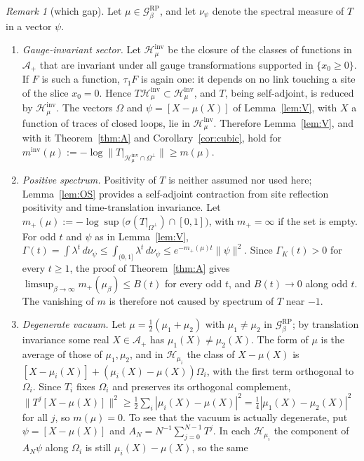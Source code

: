 \documentclass[11pt,a4paper]{article}
\theoremstyle{plain}
\theoremstyle{definition}
\theoremstyle{remark}
\newtheorem{remark}[theorem]{Remark}
\numberwithin{equation}{section}
\newcommand{\cG}{\mathcal{G}}
\newcommand{\cH}{\mathcal{H}}
\begin{document}
\begin{remark}[which gap]\label{rem:whichgap}
Let $\mu\in\cG^{\mathrm{RP}}_\beta$, and let $\nu_\psi$ denote the spectral measure of $T$ in a vector $\psi$.
\begin{enumerate}
\item[(i)] \emph{Gauge-invariant sector.} Let $\cH^{\mathrm{inv}}_\mu$ be the closure of the classes of functions in $\mathcal A_+$ that are
invariant under all gauge transformations supported in $\{x_0\ge0\}$. If $F$ is such a function, $\tau_1F$ is again one: it depends on no
link touching a site of the slice $x_0=0$. Hence $T\cH^{\mathrm{inv}}_\mu\subset\cH^{\mathrm{inv}}_\mu$, and $T$, being self-adjoint, is
reduced by $\cH^{\mathrm{inv}}_\mu$. The vectors $\Omega$ and $\psi=[X-\mu(X)]$ of Lemma~\ref{lem:V}, with $X$ a function of traces of
closed loops, lie in $\cH^{\mathrm{inv}}_\mu$. Therefore Lemma~\ref{lem:V}, and with it Theorem~\ref{thm:A} and
Corollary~\ref{cor:cubic}, hold for $m^{\mathrm{inv}}(\mu):=-\log\|T|_{\cH^{\mathrm{inv}}_\mu\cap\Omega^\perp}\|\ge m(\mu)$.
\item[(ii)] \emph{Positive spectrum.} Positivity of $T$ is neither assumed nor used here; Lemma~\ref{lem:OS} provides a self-adjoint
contraction from site reflection positivity and time-translation invariance. Let
$m_+(\mu):=-\log\sup\bigl(\sigma(T|_{\Omega^\perp})\cap[0,1]\bigr)$, with $m_+=\infty$ if the set is empty. For odd $t$ and $\psi$ as in
Lemma~\ref{lem:V}, $\Gamma(t)=\int\lambda^t\,d\nu_\psi\le\int_{(0,1]}\lambda^t\,d\nu_\psi\le e^{-m_+(\mu)t}\|\psi\|^2$. Since
$\Gamma_K(t)>0$ for every $t\ge1$, the proof of Theorem~\ref{thm:A} gives $\limsup_{\beta\to\infty}m_+(\mu_\beta)\le B(t)$ for every odd $t$,
and $B(t)\to0$ along odd $t$. The vanishing of $m$ is therefore not caused by spectrum of $T$ near $-1$.
\item[(iii)] \emph{Degenerate vacuum.} Let $\mu=\frac12(\mu_1+\mu_2)$ with $\mu_1\ne\mu_2$ in $\cG^{\mathrm{RP}}_\beta$; by translation
invariance some real $X\in\mathcal A_+$ has $\mu_1(X)\ne\mu_2(X)$. The form of $\mu$ is the average of those of $\mu_1,\mu_2$, and in $\cH_{\mu_i}$
the class of $X-\mu(X)$ is $[X-\mu_i(X)]+(\mu_i(X)-\mu(X))\Omega_i$, with the first term orthogonal to $\Omega_i$. Since $T_i$ fixes
$\Omega_i$ and preserves its orthogonal complement, $\|T^j[X-\mu(X)]\|^2\ge\frac12\sum_i|\mu_i(X)-\mu(X)|^2=\frac14|\mu_1(X)-\mu_2(X)|^2$ for
all $j$, so $m(\mu)=0$. To see that the vacuum is actually degenerate, put $\psi=[X-\mu(X)]$ and
$A_N=N^{-1}\sum_{j=0}^{N-1}T^j$. In each $\cH_{\mu_i}$ the component of $A_N\psi$ along $\Omega_i$ is still $\mu_i(X)-\mu(X)$, so the same

\end{enumerate}
\end{remark}
\end{document}

